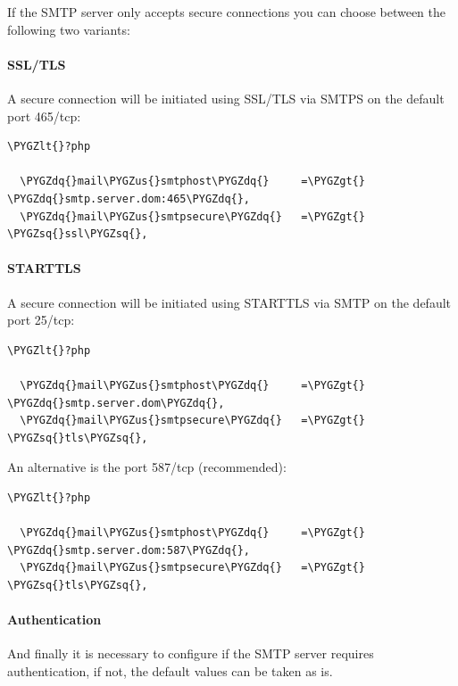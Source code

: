 \documentclass[letterpaper,10pt,english]{sphinxmanual}
\def\PYGZus{\char`\_}
\def\PYGZlt{\char`\<}
\def\PYGZgt{\char`\>}
\def\PYGZsq{\char`\'}
\def\PYGZdq{\char`\"}
\renewcommand\PYGZsq{\textquotesingle}
\begin{document}
If the SMTP server only accepts secure connections you can choose between
the following two variants:


\paragraph{SSL/TLS}
\label{configuration_server/email_configuration:ssl-tls}
A secure connection will be initiated using SSL/TLS via SMTPS on the default port 465/tcp:

\begin{Verbatim}[commandchars=\\\{\}]
\PYGZlt{}?php

  \PYGZdq{}mail\PYGZus{}smtphost\PYGZdq{}     =\PYGZgt{} \PYGZdq{}smtp.server.dom:465\PYGZdq{},
  \PYGZdq{}mail\PYGZus{}smtpsecure\PYGZdq{}   =\PYGZgt{} \PYGZsq{}ssl\PYGZsq{},
\end{Verbatim}


\paragraph{STARTTLS}
\label{configuration_server/email_configuration:starttls}
A secure connection will be initiated using STARTTLS via SMTP on the default port 25/tcp:

\begin{Verbatim}[commandchars=\\\{\}]
\PYGZlt{}?php

  \PYGZdq{}mail\PYGZus{}smtphost\PYGZdq{}     =\PYGZgt{} \PYGZdq{}smtp.server.dom\PYGZdq{},
  \PYGZdq{}mail\PYGZus{}smtpsecure\PYGZdq{}   =\PYGZgt{} \PYGZsq{}tls\PYGZsq{},
\end{Verbatim}

An alternative is the port 587/tcp (recommended):

\begin{Verbatim}[commandchars=\\\{\}]
\PYGZlt{}?php

  \PYGZdq{}mail\PYGZus{}smtphost\PYGZdq{}     =\PYGZgt{} \PYGZdq{}smtp.server.dom:587\PYGZdq{},
  \PYGZdq{}mail\PYGZus{}smtpsecure\PYGZdq{}   =\PYGZgt{} \PYGZsq{}tls\PYGZsq{},
\end{Verbatim}


\paragraph{Authentication}
\label{configuration_server/email_configuration:authentication}
And finally it is necessary to configure if the SMTP server requires
authentication, if not, the default values can be taken as is.
\end{document}
